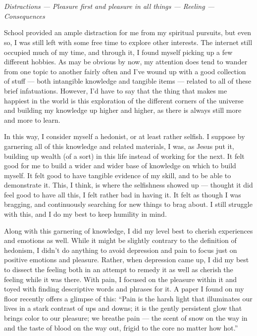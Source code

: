 \documentclass{book}
\begin{document}
\chapter{}
\begin{center}
	\emph{Distractions --- Pleasure first and pleasure in all things --- Reeling --- Consequences}
\end{center}

School provided an ample distraction for me from my spiritual pursuits, but even so, I was still left with some free time to explore other interests.  The internet still occupied much of my time, and through it, I found myself picking up a few different hobbies.  As may be obvious by now, my attention does tend to wander from one topic to another fairly often and I've wound up with a good collection of stuff --- both intangible knowledge and tangible items --- related to all of these brief infatuations.  However, I'd have to say that the thing that makes me happiest in the world is this exploration of the different corners of the universe and building my knowledge up higher and higher, as there is always still more and more to learn.

In this way, I consider myself a hedonist, or at least rather selfish.  I suppose by garnering all of this knowledge and related materials, I was, as Jesus put it, building up wealth (of a sort) in this life instead of working for the next.  It felt good for me to build a wider and wider base of knowledge on which to build myself.  It felt good to have tangible evidence of my skill, and to be able to demonstrate it.  This, I think, is where the selfishness showed up --- thought it did feel good to have all this, I felt rather bad in having it.  It felt as though I was bragging, and continuously searching for new things to brag about.  I still struggle with this, and I do my best to keep humility in mind.

Along with this garnering of knowledge, I did my level best to cherish experiences and emotions as well.  While it might be slightly contrary to the definition of hedonism, I didn't do anything to avoid depression and pain to focus just on positive emotions and pleasure.  Rather, when depression came up, I did my best to dissect the feeling both in an attempt to remedy it as well as cherish the feeling while it was there.  With pain, I focused on the pleasure within it and toyed with finding descriptive words and phrases for it.  A paper I found on my floor recently offers a glimpse of this: ``Pain is the harsh light that illuminates our lives in a stark contrast of ups and downs; it is the gently persistent glow that brings color to our pleasure; we breathe pain --- the scent of snow on the way in and the taste of blood on the way out, frigid to the core no matter how hot.''
\end{document}
